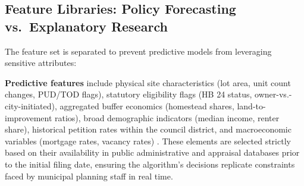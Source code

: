 \documentclass[11pt, letterpaper]{article}
\begin{document}
\begin{table}[htbp]
    \centering
    \caption[Exemplar State Protest Petition Thresholds]{Illustrative statutory parameters governing protest petitions across states detailed by Furth and McKinley \cite{furth2025protest}. While 21 states utilize similar architectures, the threshold mechanism and buffer stringency dictate the severity of the institutional veto.}
    \label{tab:state_thresholds}
\end{table}

\subsection{Feature Libraries: Policy Forecasting vs.\ Explanatory Research}

The feature set is separated to prevent predictive models from leveraging sensitive attributes:

\textbf{Predictive features} include physical site characteristics (lot area, unit count changes, PUD/TOD flags), statutory eligibility flags (HB 24 status, owner-vs.-city-initiated), aggregated buffer economics (homestead shares, land-to-improvement ratios), broad demographic indicators (median income, renter share), historical petition rates within the council district, and macroeconomic variables (mortgage rates, vacancy rates) \cite{fredmacro}. These elements are selected strictly based on their availability in public administrative and appraisal databases prior to the initial filing date, ensuring the algorithm's decisions replicate constraints faced by municipal planning staff in real time.
\end{document}
